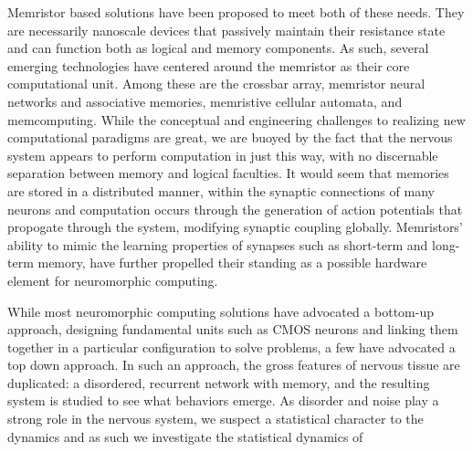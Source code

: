 \documentclass[aps,prl,preprint,groupedaddress]{revtex4-1}
\begin{document}
Memristor based solutions have been proposed to meet both of these needs.
They are
necessarily nanoscale devices that passively maintain their resistance
state and can function both as logical and memory components.  As such,
several emerging technologies have centered around the memristor as
their core computational unit.  Among these are the crossbar array,
memristor neural networks and associative memories, memristive cellular
automata, and memcomputing.  While the conceptual and engineering
challenges to realizing new computational paradigms are great, we are
buoyed by the fact that the nervous system appears to perform computation
in just this way, with no discernable separation between memory and
logical faculties.  It would seem that memories are stored in a
distributed manner, within the synaptic connections of many neurons
and computation occurs through the generation of action potentials that
propogate through the system, modifying synaptic coupling globally.
Memristors' ability to mimic the learning properties of synapses such as
short-term and long-term memory, have further propelled their standing as
a possible hardware element for neuromorphic computing.

While most neuromorphic computing solutions have advocated a bottom-up
approach, designing fundamental units such as CMOS neurons
and linking them together in a
particular configuration to solve problems, a few have advocated a top
down approach.  In such an approach, the gross features of nervous
tissue are duplicated: a disordered, recurrent network with memory, and
the resulting system is studied to see what behaviors emerge.  As disorder
and noise play a strong role in the nervous system, we suspect a statistical
character to the dynamics and as such we investigate the statistical
dynamics of 




%
\end{document}
